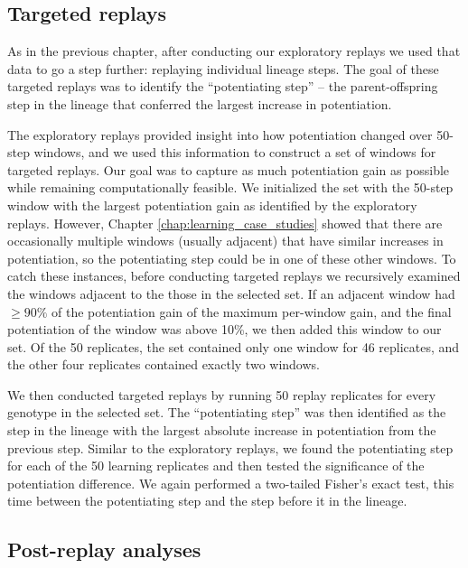 \subsection{Targeted replays}

As in the previous chapter, after conducting our exploratory replays we used that data to go a step further: replaying individual lineage steps. 
The goal of these targeted replays was to identify the ``potentiating step'' -- the parent-offspring step in the lineage that conferred the largest increase in potentiation. 

The exploratory replays provided insight into how potentiation changed over 50-step windows, and we used this information to construct a set of windows for targeted replays. 
Our goal was to capture as much potentiation gain as possible while remaining computationally feasible. 
We initialized the set with the 50-step window with the largest potentiation gain as identified by the exploratory replays. 
However, Chapter \ref{chap:learning_case_studies} showed that there are occasionally multiple windows (usually adjacent) that have similar increases in potentiation, so the potentiating step could be in one of these other windows.  
To catch these instances, before conducting targeted replays we recursively examined the windows adjacent to the those in the selected set.
If an adjacent window had $\geq 90\%$ of the potentiation gain of the maximum per-window gain, and the final potentiation of the window was above 10\%, we then added this window to our set.
Of the 50 replicates, the set contained only one window for 46 replicates, and the other four replicates contained exactly two windows. 

We then conducted targeted replays by running 50 replay replicates for every genotype in the selected set.
The ``potentiating step'' was then identified as the step in the lineage with the largest absolute increase in potentiation from the previous step. 
Similar to the exploratory replays, we found the potentiating step for each of the 50 learning replicates and then tested the significance of the potentiation difference. 
We again performed a two-tailed Fisher's exact test, this time between the potentiating step and the step before it in the lineage. 

\subsection{Post-replay analyses}

